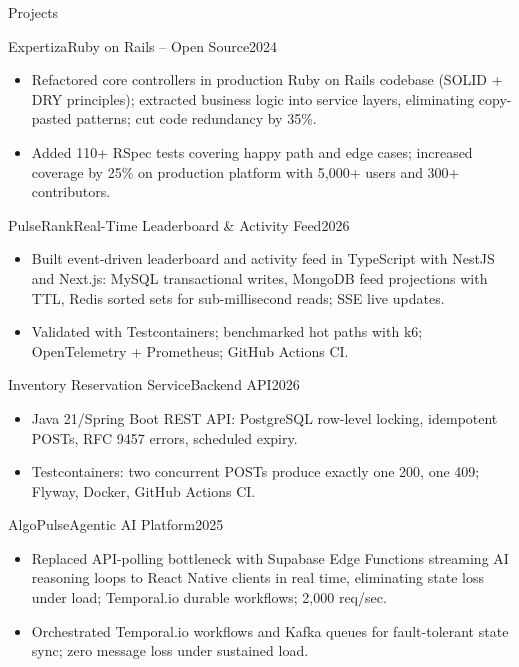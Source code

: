 \documentclass[]{mcdowellcv}
\begin{document}
\begin{cvsection}{Projects}
  \begin{cvsubsection}{Expertiza}{Ruby on Rails -- Open Source}{2024}
    \begin{itemize}
      \item Refactored core controllers in production Ruby on Rails codebase (SOLID + DRY principles); extracted business logic into service layers, eliminating copy-pasted patterns; cut code redundancy by 35\%.
      \item Added 110+ RSpec tests covering happy path and edge cases; increased coverage by 25\% on production platform with 5,000+ users and 300+ contributors.
    \end{itemize}
    \vspace{-1.5pt}
  \end{cvsubsection}

  \begin{cvsubsection}{PulseRank}{Real-Time Leaderboard \& Activity Feed}{2026}
    \begin{itemize}
      \item Built event-driven leaderboard and activity feed in TypeScript with NestJS and Next.js: MySQL transactional writes, MongoDB feed projections with TTL, Redis sorted sets for sub-millisecond reads; SSE live updates.
      \item Validated with Testcontainers; benchmarked hot paths with k6; OpenTelemetry + Prometheus; GitHub Actions CI.
    \end{itemize}
    \vspace{-1.5pt}
  \end{cvsubsection}

  \begin{cvsubsection}{Inventory Reservation Service}{Backend API}{2026}
    \begin{itemize}
      \item Java 21/Spring Boot REST API: PostgreSQL row-level locking, idempotent POSTs, RFC 9457 errors, scheduled expiry.
      \item Testcontainers: two concurrent POSTs produce exactly one 200, one 409; Flyway, Docker, GitHub Actions CI.
    \end{itemize}
    \vspace{-1.5pt}
  \end{cvsubsection}

  \begin{cvsubsection}{AlgoPulse}{Agentic AI Platform}{2025}
    \begin{itemize}
      \item Replaced API-polling bottleneck with Supabase Edge Functions streaming AI reasoning loops to React Native clients in real time, eliminating state loss under load; Temporal.io durable workflows; 2,000 req/sec.
      \item Orchestrated Temporal.io workflows and Kafka queues for fault-tolerant state sync; zero message loss under sustained load.
    \end{itemize}
  \end{cvsubsection}
\end{cvsection}
\end{document}
